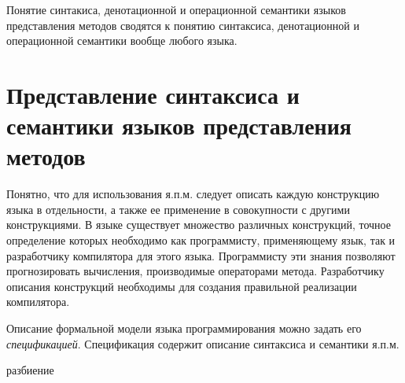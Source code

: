 Понятие синтакиса, денотационной и операционной семантики языков представления методов сводятся к понятию синтаксиса, денотационной и операционной семантики вообще любого языка.

\section{Представление синтаксиса и семантики языков представления методов}
\label{sec_programs_method_representation_language_syntax_and_semantic}

Понятно, что для использования я.п.м. следует описать каждую конструкцию языка в отдельности, а также ее применение в совокупности с другими конструкциями. В языке существует множество различных конструкций, точное определение которых необходимо как программисту, применяющему язык, так и разработчику компилятора для этого языка. Программисту эти знания позволяют прогнозировать вычисления, производимые операторами метода. Разработчику описания конструкций необходимы для создания правильной реализации компилятора.

Описание формальной модели языка программирования можно задать его \textit{спецификацией}. Спецификация содержит описание синтаксиса и семантики я.п.м.

\begin{SCn}
\begin{scnrelfromset}{разбиение}
    \begin{scnindent}
    \end{scnindent}
    \begin{scnindent}
    \end{scnindent}
    \begin{scnindent}
    \end{scnindent}
\end{scnrelfromset}
\end{SCn}

